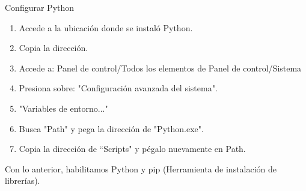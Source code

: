 \begin{frame}[t]{Configurar Python}\vspace{10pt}

\begin{enumerate}
	\item Accede a la ubicación donde se instaló Python.
	\item Copia la dirección.
	\item Accede a: Panel de control/Todos los elementos de Panel de control/Sistema
	\item Presiona sobre: "Configuración avanzada del sistema".
	\item "Variables de entorno..."
	\item Busca "Path" y pega la dirección de "Python.exe".
	\item Copia la dirección de ``Scripts" y pégalo nuevamente en Path.
\end{enumerate}

Con lo anterior, habilitamos Python y pip (Herramienta de instalación de librerías).

\end{frame}